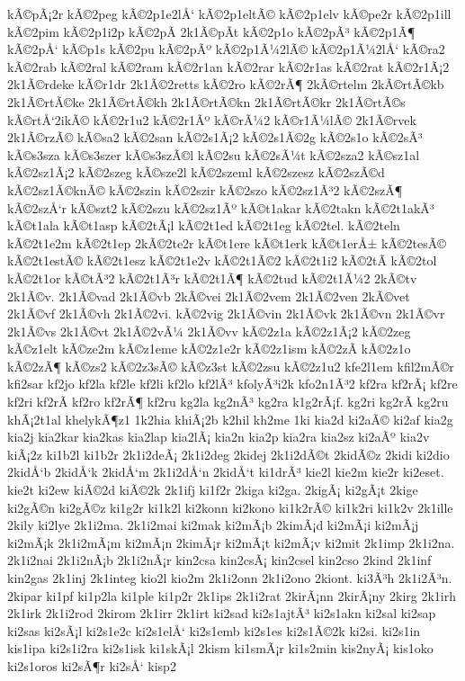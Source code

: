 {kÃ©pÃ¡2r
kÃ©2peg
kÃ©2p1e2lÅ‘
kÃ©2p1eltÃ©
kÃ©2p1elv
kÃ©pe2r
kÃ©2p1ill
kÃ©2pim
kÃ©2p1i2p
kÃ©2pÃ­
2k1Ã©pÃ­t
kÃ©2p1o
kÃ©2pÃ³
kÃ©2p1Ã¶
kÃ©2pÅ‘
kÃ©p1s
kÃ©2pu
kÃ©2pÃº
kÃ©2p1Ã¼2lÃ©
kÃ©2p1Ã¼2lÅ‘
kÃ©ra2
kÃ©2rab
kÃ©2ral
kÃ©2ram
kÃ©2r1an
kÃ©2rar
kÃ©2r1as
kÃ©2rat
kÃ©2r1Ã¡2
2k1Ã©rdeke
kÃ©r1dr
2k1Ã©2retts
kÃ©2ro
kÃ©2rÃ¶
2kÃ©rtelm
2kÃ©rtÃ©kb
2k1Ã©rtÃ©ke
2k1Ã©rtÃ©kh
2k1Ã©rtÃ©kn
2k1Ã©rtÃ©kr
2k1Ã©rtÃ©s
kÃ©rtÅ‘2ikÃ©
kÃ©2r1u2
kÃ©2r1Ãº
kÃ©rÃ¼2
kÃ©r1Ã¼lÃ©
2k1Ã©rvek
2k1Ã©rzÃ©
kÃ©sa2
kÃ©2san
kÃ©2s1Ã¡2
kÃ©2s1Ã©2g
kÃ©2s1o
kÃ©2sÃ³
kÃ©s3sza
kÃ©s3szer
kÃ©s3szÃ©l
kÃ©2su
kÃ©2sÃ¼t
kÃ©2sza2
kÃ©sz1al
kÃ©2sz1Ã¡2
kÃ©2szeg
kÃ©sze2l
kÃ©2szeml
kÃ©2szesz
kÃ©2szÃ©d
kÃ©2sz1Ã©knÃ©
kÃ©2szin
kÃ©2szir
kÃ©2szo
kÃ©2sz1Ã³2
kÃ©2szÃ¶
kÃ©2szÅ‘r
kÃ©szt2
kÃ©2szu
kÃ©2sz1Ãº
kÃ©t1akar
kÃ©2takn
kÃ©2t1akÃ³
kÃ©t1ala
kÃ©t1asp
kÃ©2tÃ¡l
kÃ©2t1ed
kÃ©2t1eg
kÃ©2tel.
kÃ©2teln
kÃ©2t1e2m
kÃ©2t1ep
2kÃ©2te2r
kÃ©t1ere
kÃ©t1erk
kÃ©t1erÅ±
kÃ©2tesÃ©
kÃ©2t1estÃ©
kÃ©2t1esz
kÃ©2t1e2v
kÃ©2t1Ã©2
kÃ©2t1i2
kÃ©2tÃ­
kÃ©2tol
kÃ©2t1or
kÃ©tÃ³2
kÃ©2t1Ã³r
kÃ©2t1Ã¶
kÃ©2tud
kÃ©2t1Ã¼2
2kÃ©tv
2k1Ã©v.
2k1Ã©vad
2k1Ã©vb
2kÃ©vei
2k1Ã©2vem
2k1Ã©2ven
2kÃ©vet
2k1Ã©vf
2k1Ã©vh
2k1Ã©2vi.
kÃ©2vig
2k1Ã©vin
2k1Ã©vk
2k1Ã©vn
2k1Ã©vr
2k1Ã©vs
2k1Ã©vt
2k1Ã©2vÃ¼
2k1Ã©vv
kÃ©2z1a
kÃ©2z1Ã¡2
kÃ©2zeg
kÃ©z1elt
kÃ©ze2m
kÃ©z1eme
kÃ©2z1e2r
kÃ©2z1ism
kÃ©2zÃ­
kÃ©2z1o
kÃ©2zÃ¶
kÃ©zs2
kÃ©2z3sÃ©
kÃ©z3st
kÃ©2zsu
kÃ©2z1u2
kfe2l1em
kfil2mÃ©r
kfi2sar
kf2jo
kf2la
kf2le
kf2li
kf2lo
kf2lÃ³
kfolyÃ³i2k
kfo2n1Ã³2
kf2ra
kf2rÃ¡
kf2re
kf2ri
kf2rÃ­
kf2ro
kf2rÃ¶
kf2ru
kg2la
kg2nÃ³
kg2ra
k1g2rÃ¡f.
kg2ri
kg2rÃ­
kg2ru
khÃ¡2t1al
khelykÃ¶z1
1k2hia
khiÃ¡2b
k2hil
kh2me
1ki
kia2d
ki2aÃ©
ki2af
kia2g
kia2j
kia2kar
kia2kas
kia2lap
kia2lÃ¡
kia2n
kia2p
kia2ra
kia2sz
ki2aÃº
kia2v
kiÃ¡2z
ki1b2l
ki1b2r
2k1i2deÃ¡
2k1i2deg
2kidej
2k1i2dÃ©t
2kidÃ©z
2kidi
ki2dio
2kidÅ‘b
2kidÅ‘k
2kidÅ‘m
2k1i2dÅ‘n
2kidÅ‘t
ki1drÃ³
kie2l
kie2m
kie2r
ki2eset.
kie2t
ki2ew
kiÃ©2d
kiÃ©2k
2k1ifj
ki1f2r
2kiga
ki2ga.
2kigÃ¡
ki2gÃ¡t
2kige
ki2gÃ©n
ki2gÃ©z
ki1g2r
ki1k2l
ki2konn
ki2kono
ki1k2rÃ©
ki1k2ri
ki1k2v
2k1ille
2kily
ki2lye
2k1i2ma.
2k1i2mai
ki2mak
ki2mÃ¡b
2kimÃ¡d
ki2mÃ¡i
ki2mÃ¡j
ki2mÃ¡k
2k1i2mÃ¡m
ki2mÃ¡n
2kimÃ¡r
ki2mÃ¡t
ki2mÃ¡v
ki2mit
2k1imp
2k1i2na.
2k1i2nai
2k1i2nÃ¡b
2k1i2nÃ¡r
kin2csa
kin2csÃ¡
kin2csel
kin2cso
2kind
2k1inf
kin2gas
2k1inj
2k1integ
kio2l
kio2m
2k1i2onn
2k1i2ono
2kiont.
ki3Ã³h
2k1i2Ã³n.
2kipar
ki1pf
ki1p2la
ki1ple
ki1p2r
2k1ips
2k1i2rat
2kirÃ¡nn
2kirÃ¡ny
2kirg
2k1irh
2k1irk
2k1i2rod
2kirom
2k1irr
2k1irt
ki2sad
ki2s1ajtÃ³
ki2s1akn
ki2sal
ki2sap
ki2sas
ki2sÃ¡l
ki2s1e2c
ki2s1elÅ‘
ki2s1emb
ki2s1es
ki2s1Ã©2k
ki2si.
ki2s1in
kis1ipa
ki2s1i2ra
ki2s1isk
ki1skÃ¡l
2kism
ki1smÃ¡r
ki1s2min
kis2nyÃ¡
kis1oko
ki2s1oros
ki2sÃ¶r
ki2sÅ‘
kisp2
}
